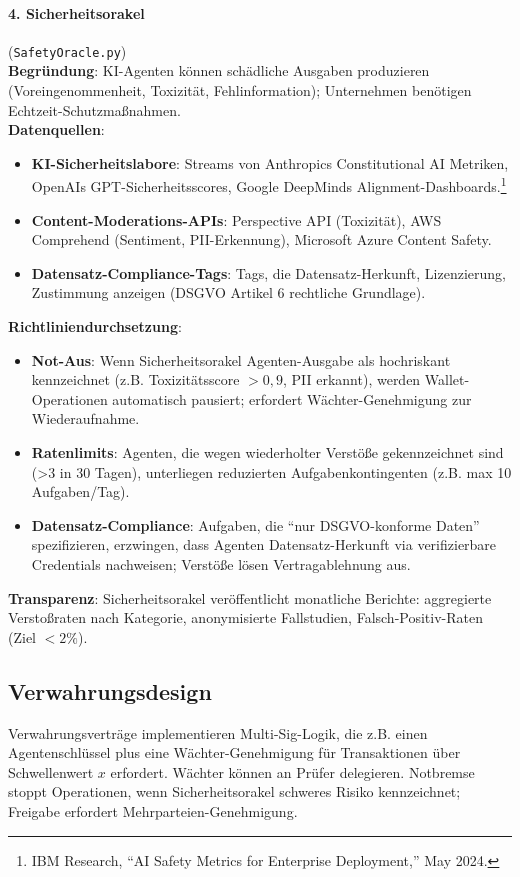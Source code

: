 \documentclass[11pt]{article}
\begin{document}
\paragraph{4. Sicherheitsorakel} (\texttt{SafetyOracle.py})\\
\textbf{Begründung}: KI-Agenten können schädliche Ausgaben produzieren (Voreingenommenheit, Toxizität, Fehlinformation); Unternehmen benötigen Echtzeit-Schutzmaßnahmen.\\
\textbf{Datenquellen}:
\begin{itemize}[noitemsep]
  \item \textbf{KI-Sicherheitslabore}: Streams von Anthropics Constitutional AI Metriken, OpenAIs GPT-Sicherheitsscores, Google DeepMinds Alignment-Dashboards.\footnote{IBM Research, ``AI Safety Metrics for Enterprise Deployment,'' May 2024.}
  \item \textbf{Content-Moderations-APIs}: Perspective API (Toxizität), AWS Comprehend (Sentiment, PII-Erkennung), Microsoft Azure Content Safety.
  \item \textbf{Datensatz-Compliance-Tags}: Tags, die Datensatz-Herkunft, Lizenzierung, Zustimmung anzeigen (DSGVO Artikel 6 rechtliche Grundlage).
\end{itemize}
\textbf{Richtliniendurchsetzung}:
\begin{itemize}[noitemsep]
  \item \textbf{Not-Aus}: Wenn Sicherheitsorakel Agenten-Ausgabe als hochriskant kennzeichnet (z.B. Toxizitätsscore $>0,9$, PII erkannt), werden Wallet-Operationen automatisch pausiert; erfordert Wächter-Genehmigung zur Wiederaufnahme.
  \item \textbf{Ratenlimits}: Agenten, die wegen wiederholter Verstöße gekennzeichnet sind (>3 in 30 Tagen), unterliegen reduzierten Aufgabenkontingenten (z.B. max 10 Aufgaben/Tag).
  \item \textbf{Datensatz-Compliance}: Aufgaben, die ``nur DSGVO-konforme Daten'' spezifizieren, erzwingen, dass Agenten Datensatz-Herkunft via verifizierbare Credentials nachweisen; Verstöße lösen Vertragablehnung aus.
\end{itemize}
\textbf{Transparenz}: Sicherheitsorakel veröffentlicht monatliche Berichte: aggregierte Verstoßraten nach Kategorie, anonymisierte Fallstudien, Falsch-Positiv-Raten (Ziel $<2\%$).

\subsection{Verwahrungsdesign}
Verwahrungsverträge implementieren Multi-Sig-Logik, die z.B. einen Agentenschlüssel plus eine Wächter-Genehmigung für Transaktionen über Schwellenwert $x$ erfordert. Wächter können an Prüfer delegieren. Notbremse stoppt Operationen, wenn Sicherheitsorakel schweres Risiko kennzeichnet; Freigabe erfordert Mehrparteien-Genehmigung.
\end{document}
